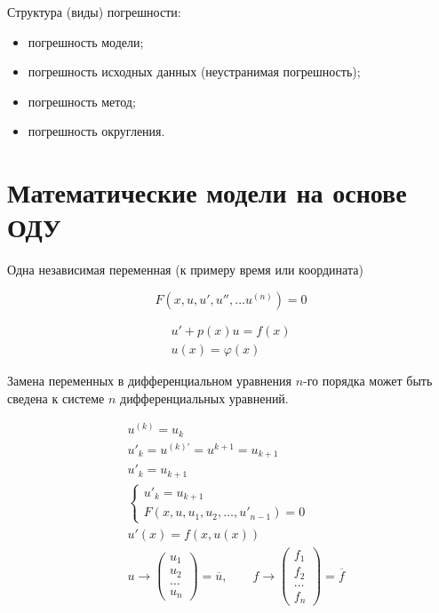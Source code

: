 \noindent
Структура (виды) погрешности:
\begin{itemize}
	\item погрешность модели;
	\item погрешность исходных данных (неустранимая погрешность);
	\item погрешность метод;
	\item погрешность округления.
\end{itemize}



\section{Математические модели на основе ОДУ}

\begin{defn}
	Одна независимая переменная (к примеру время или координата)
\end{defn}

\[
	F(x, u, u', u'', \dots u^{(n)}) = 0
\]

\begin{align*}
	u' + p(x) u = f(x)
	\\
	u(x) = \varphi(x)
\end{align*}

\begin{defn}
	Замена переменных в дифференциальном уравнения $n$-го порядка может быть сведена к системе $n$ дифференциальных уравнений.
\end{defn}

\begin{align*}
	&u^{(k)} = u_k
	\\
	&u'_k = u^{(k)'} = u^{k+1} = u_{k+1}
	\\
	&u'_k = u_{k+1}
	\\
	&\begin{cases}
		u'_k = u_{k+1}
		\\
		F(x, u, u_1, u_2, \dots, u'_{n-1}) = 0
	\end{cases}
	\\
	&u'(x) = f(x, u(x))
	\\
	&u \to \begin{pmatrix}
	u_1 \\
	u_2 \\
	\dots \\
	u_n
	\end{pmatrix} = \overline{u}, \qquad 
	f \to \begin{pmatrix}
	f_1 \\
	f_2 \\
	\dots \\
	f_n
	\end{pmatrix} = \overline{f}
\end{align*}


